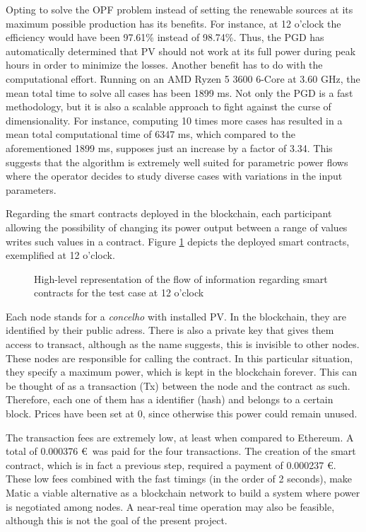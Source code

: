 Opting to solve the OPF problem instead of setting the renewable sources at its maximum possible production has its benefits. For instance, at 12 o'clock the efficiency would have been 97.61\% instead of 98.74\%. Thus, the PGD has automatically determined that PV should not work at its full power during peak hours in order to minimize the losses. Another benefit has to do with the computational effort. Running on an AMD Ryzen 5 3600 6-Core at 3.60 GHz, the mean total time to solve all cases has been 1899 ms. Not only the PGD is a fast methodology, but it is also a scalable approach to fight against the curse of dimensionality. For instance, computing 10 times more cases has resulted in a mean total computational time of 6347 ms, which compared to the aforementioned 1899 ms, supposes just an increase by a factor of 3.34. This suggests that the algorithm is extremely well suited for parametric power flows where the operator decides to study diverse cases with variations in the input parameters.

Regarding the smart contracts deployed in the blockchain, each participant allowing the possibility of changing its power output between a range of values writes such values in a contract. Figure \ref{fig:smarts1} depicts the deployed smart contracts, exemplified at 12 o'clock. 

\begin{figure}[!htb]\centering
    \caption{High-level representation of the flow of information regarding smart contracts for the test case at 12 o'clock}
    \label{fig:smarts1}
\end{figure}
Each node stands for a \textit{concelho} with installed PV. In the blockchain, they are identified by their public adress. There is also a private key that gives them access to transact, although as the name suggests, this is invisible to other nodes. These nodes are responsible for calling the contract. In this particular situation, they specify a maximum power, which is kept in the blockchain forever. This can be thought of as a transaction (Tx) between the node and the contract as such. Therefore, each one of them has a identifier (hash) and belongs to a certain block. Prices have been set at 0, since otherwise this power could remain unused.

The transaction fees are extremely low, at least when compared to Ethereum. A total of 0.000376 \euro \ was paid for the four transactions. The creation of the smart contract, which is in fact a previous step, required a payment of 0.000237 \euro . These low fees combined with the fast timings (in the order of 2 seconds), make Matic a viable alternative as a blockchain network to build a system where power is negotiated among nodes. A near-real time operation may also be feasible, although this is not the goal of the present project. 

